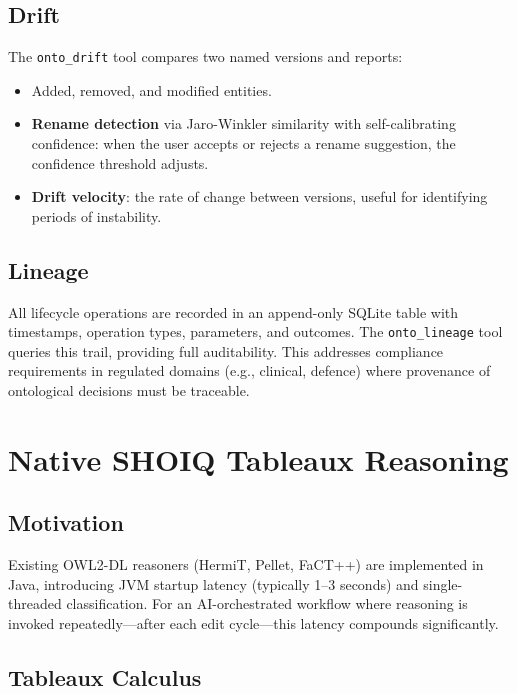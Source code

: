 \documentclass[runningheads]{llncs}
\begin{document}
\subsection{Drift}
\label{sec:drift}

The \texttt{onto\_drift} tool compares two named versions and reports:

\begin{itemize}
    \item Added, removed, and modified entities.
    \item \textbf{Rename detection} via Jaro-Winkler similarity with self-calibrating confidence: when the user accepts or rejects a rename suggestion, the confidence threshold adjusts.
    \item \textbf{Drift velocity}: the rate of change between versions, useful for identifying periods of instability.
\end{itemize}

\subsection{Lineage}
\label{sec:lineage}

All lifecycle operations are recorded in an append-only SQLite table with timestamps, operation types, parameters, and outcomes. The \texttt{onto\_lineage} tool queries this trail, providing full auditability. This addresses compliance requirements in regulated domains (e.g., clinical, defence) where provenance of ontological decisions must be traceable.


\section{Native SHOIQ Tableaux Reasoning}
\label{sec:reasoning}

\subsection{Motivation}

Existing OWL2-DL reasoners (HermiT, Pellet, FaCT++) are implemented in Java, introducing JVM startup latency (typically 1--3 seconds) and single-threaded classification. For an AI-orchestrated workflow where reasoning is invoked repeatedly—after each edit cycle—this latency compounds significantly.

\subsection{Tableaux Calculus}
\end{document}
